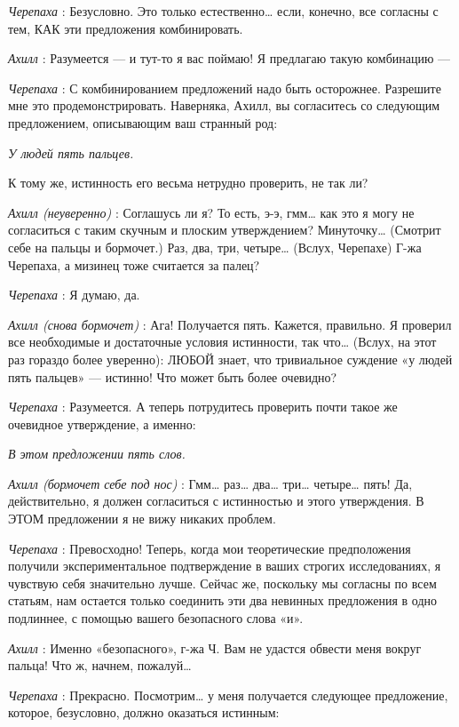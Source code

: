 \emph{Черепаха} : Безусловно. Это только естественно\ldots{} если, конечно, все согласны с тем, КАК эти предложения комбинировать.

\emph{Ахилл} : Разумеется --- и тут-то я вас поймаю! Я предлагаю такую комбинацию ---

\emph{Черепаха} : С комбинированием предложений надо быть осторожнее. Разрешите мне это продемонстрировать. Наверняка, Ахилл, вы согласитесь со следующим предложением, описывающим ваш странный род:

\emph{У людей пять пальцев.}

К тому же, истинность его весьма нетрудно проверить, не так ли?

\emph{Ахилл (неуверенно)} : Соглашусь ли я? То есть, э-э, гмм\ldots{} как это я могу не согласиться с таким скучным и плоским утверждением? Минуточку\ldots{} (Смотрит себе на пальцы и бормочет.) Раз, два, три, четыре\ldots{} (Вслух, Черепахе) Г-жа Черепаха, а мизинец тоже считается за палец?

\emph{Черепаха} : Я думаю, да.

\emph{Ахилл (снова бормочет)} : Ага! Получается пять. Кажется, правильно. Я проверил все необходимые и достаточные условия истинности, так что\ldots{} (Вслух, на этот раз гораздо более уверенно): ЛЮБОЙ знает, что тривиальное суждение «у людей пять пальцев» --- истинно! Что может быть более очевидно?

\emph{Черепаха} : Разумеется. А теперь потрудитесь проверить почти такое же очевидное утверждение, а именно:

\emph{В этом предложении пять слов.}

\emph{Ахилл (бормочет себе под нос)} : Гмм\ldots{} раз\ldots{} два\ldots{} три\ldots{} четыре\ldots{} пять! Да, действительно, я должен согласиться с истинностью и этого утверждения. В ЭТОМ предложении я не вижу никаких проблем.

\emph{Черепаха} : Превосходно! Теперь, когда мои теоретические предположения получили экспериментальное подтверждение в ваших строгих исследованиях, я чувствую себя значительно лучше. Сейчас же, поскольку мы согласны по всем статьям, нам остается только соединить эти два невинных предложения в одно подлиннее, с помощью вашего безопасного слова «и».

\emph{Ахилл} : Именно «безопасного», г-жа Ч. Вам не удастся обвести меня вокруг пальца! Что ж, начнем, пожалуй\ldots{}

\emph{Черепаха} : Прекрасно. Посмотрим\ldots{} у меня получается следующее предложение, которое, безусловно, должно оказаться истинным:

